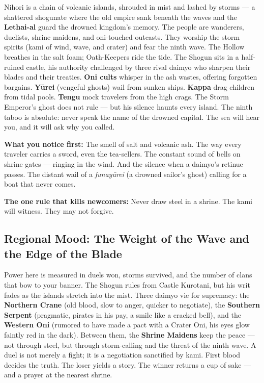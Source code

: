 \vspace{2mm}
\begin{tcolorbox}[colback=black!3,colframe=blue!60!black,title={Theme \& Atmosphere},breakable]
Nihori is a chain of volcanic islands, shrouded in mist and lashed by storms --- a shattered shogunate where the old empire sank beneath the waves and the \textbf{Lethai-al} guard the drowned kingdom's memory. The people are wanderers, duelists, shrine maidens, and oni-touched outcasts. They worship the storm spirits (kami of wind, wave, and crater) and fear the ninth wave. The Hollow breathes in the salt foam; Oath-Keepers ride the tide. The Shogun sits in a half-ruined castle, his authority challenged by three rival daimyo who sharpen their blades and their treaties. \textbf{Oni cults} whisper in the ash wastes, offering forgotten bargains. \textbf{Y{\=u}rei} (vengeful ghosts) wail from sunken ships. \textbf{Kappa} drag children from tidal pools. \textbf{Tengu} mock travelers from the high crags. The Storm Emperor's ghost does not rule --- but his silence haunts every island. The ninth taboo is absolute: never speak the name of the drowned capital. The sea will hear you, and it will ask why you called.

\vspace{2mm}
\textbf{What you notice first:} The smell of salt and volcanic ash. The way every traveler carries a sword, even the tea-sellers. The constant sound of bells on shrine gates --- ringing in the wind. And the silence when a daimyo's retinue passes. The distant wail of a \textit{funay{\=u}rei} (a drowned sailor's ghost) calling for a boat that never comes.

\textbf{The one rule that kills newcomers:} Never draw steel in a shrine. The kami will witness. They may not forgive.
\end{tcolorbox}

\subsection*{Regional Mood: The Weight of the Wave and the Edge of the Blade}

Power here is measured in duels won, storms survived, and the number of clans that bow to your banner. The Shogun rules from Castle Kurotani, but his writ fades as the islands stretch into the mist. Three daimyo vie for supremacy: the \textbf{Northern Crane} (old blood, slow to anger, quicker to negotiate), the \textbf{Southern Serpent} (pragmatic, pirates in his pay, a smile like a cracked bell), and the \textbf{Western Oni} (rumored to have made a pact with a Crater Oni, his eyes glow faintly red in the dark). Between them, the \textbf{Shrine Maidens} keep the peace --- not through steel, but through storm-calling and the threat of the ninth wave. A duel is not merely a fight; it is a negotiation sanctified by kami. First blood decides the truth. The loser yields a story. The winner returns a cup of sake --- and a prayer at the nearest shrine.

